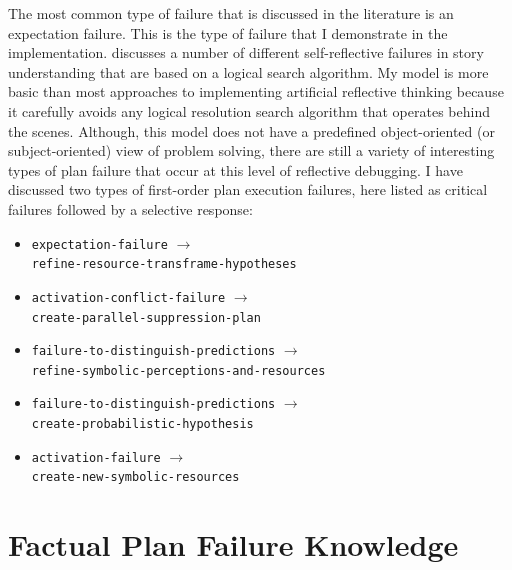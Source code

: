 The most common type of failure that is discussed in the literature is
an expectation failure.  This is the type of failure that I
demonstrate in the implementation.  \cite{cox:2007a} discusses a
number of different self-reflective failures in story understanding
that are based on a logical search algorithm.  My model is more basic
than most approaches to implementing artificial reflective thinking
because it carefully avoids any logical resolution search algorithm
that operates behind the scenes.  Although, this model does not have a
predefined object-oriented (or subject-oriented) view of problem
solving, there are still a variety of interesting types of plan
failure that occur at this level of reflective debugging.  I have
discussed two types of first-order plan execution failures, here
listed as critical failures followed by a selective response:
\begin{itemize}
\item {\tt expectation-failure} $\longrightarrow$ \\
      {\tt refine-resource-transframe-hypotheses}
\item {\tt activation-conflict-failure} $\longrightarrow$ \\
      {\tt create-parallel-suppression-plan}
\item {\tt failure-to-distinguish-predictions} $\longrightarrow$ \\
      {\tt refine-symbolic-perceptions-and-resources}
\item {\tt failure-to-distinguish-predictions} $\longrightarrow$ \\
      {\tt create-probabilistic-hypothesis}
\item {\tt activation-failure} $\longrightarrow$ \\
      {\tt create-new-symbolic-resources}
\end{itemize}

\section{Factual Plan Failure Knowledge}

